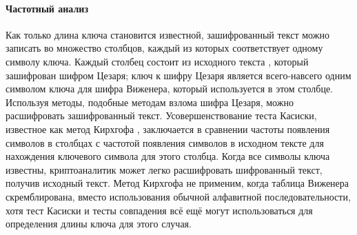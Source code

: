 \paragraph{Частотный анализ}

Как только длина ключа становится известной, зашифрованный текст 
можно записать во множество столбцов, каждый из которых соответствует 
одному символу ключа. Каждый столбец состоит из исходного текста
, который зашифрован шифром Цезаря; ключ к шифру Цезаря является 
всего-навсего одним символом ключа для шифра Виженера, который 
используется в этом столбце. Используя методы, подобные методам 
взлома шифра Цезаря, можно расшифровать зашифрованный текст. 
Усовершенствование теста Касиски, известное как метод Кирхгофа
, заключается в сравнении частоты появления символов в столбцах 
с частотой появления символов в исходном тексте для нахождения 
ключевого символа для этого столбца. Когда все символы ключа 
известны, криптоаналитик может легко расшифровать шифрованный 
текст, получив исходный текст. Метод Кирхгофа не применим, когда 
таблица Виженера скремблирована, вместо использования обычной 
алфавитной последовательности, хотя тест Касиски и тесты совпадения 
всё ещё могут использоваться для определения длины ключа для 
этого случая.
